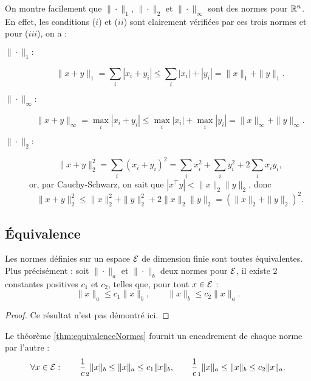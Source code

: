 
\remark
On montre facilement que $\|\cdot\|_1$, $\|\cdot\|_2$ et $\|\cdot\|_\infty$ sont des normes pour $\mathbb{R}^n$. En effet, les conditions ($i$) et ($ii$) sont clairement vérifiées par ces trois normes et pour ($iii$), on a :
\begin{description}
  \item[$\|\cdot\|_1:$] 
  $$\|x+y\|_1 = \sum_i |x_i + y_i| \leq \sum_i |x_i| + |y_i| =  \|x\|_1 + \|y\|_1.$$
  \item[$\|\cdot\|_\infty:$] 
  $$\|x+y\|_\infty = \max_i |x_i + y_i| \leq \max_i |x_i| + \max_i |y_i| =  \|x\|_\infty + \|y\|_\infty.$$
  \item[$\|\cdot\|_2:$] 
  $$\|x+y\|^2_2 = \sum_i (x_i + y_i)^2 = \sum_i x_i^2 + \sum_i y_i^2 + 2 \sum_i x_i y_i,$$ 
  or, par Cauchy-Schwarz, on sait que $|x^\top y| < \|x\|_2 \|y\|_2$, donc 
  $$\|x+y\|^2_2 \leq \|x\|_2^2 + \|y\|_2^2 + 2 \|x\|_2 \|y\|_2 = (\|x\|_2 + \|y\|_2)^2.$$
\end{description}

\subsection{\'Equivalence} 

\begin{theorem} \label{thm:equivalenceNormes}
  Les normes définies sur un espace $\mathcal{E}$ de dimension finie sont toutes équivalentes. Plus précisément : soit $\|\cdot\|_a$ et $\|\cdot\|_b$ deux normes pour $\mathcal{E}$, il existe 2 constantes positives $c_1$ et $c_2$, telles que, pour tout $x \in \mathcal{E}$ :
  $$
  \|x\|_a \leq c_1 \|x\|_b, \qquad
  \|x\|_b \leq c_2 \|x\|_a.
  $$
\end{theorem}

\begin{proof}
Ce résultat n'est pas démontré ici. 
\end{proof}

\remark
Le théorème \ref{thm:equivalenceNormes} fournit un encadrement de chaque norme par l'autre : 
$$
\forall x \in \mathcal{E}: \qquad
\frac1c_2 \|x\|_b \leq \|x\|_a \leq c_1 \|x\|_b, \qquad
\frac1c_1 \|x\|_a \leq \|x\|_b \leq c_2 \|x\|_a.
$$

